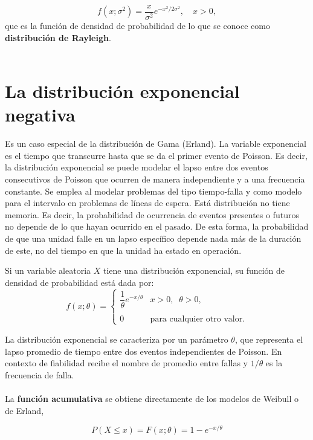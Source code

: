 $$f\left(x;\sigma^2\right)=\dfrac{x}{\sigma^2}e^{-x^2/2\sigma^2},\quad x>0,$$
que es la función de densidad de probabilidad de lo que se conoce como \textbf{distribución de Rayleigh}.\\\\

\section{La distribución exponencial negativa}
Es un caso especial de la distribución de Gama (Erland). La variable exponencial es el tiempo que transcurre hasta que se da el primer evento de Poisson. Es decir, la distribución exponencial se puede modelar el lapso entre dos eventos consecutivos de Poisson que ocurren de manera independiente y a una frecuencia constante. Se emplea al modelar problemas del tipo tiempo-falla y como modelo para el intervalo en problemas de líneas de espera. Está distribución no tiene memoria. Es decir, la probabilidad de ocurrencia de eventos presentes o futuros no depende de lo que hayan ocurrido en el pasado. De esta forma, la probabilidad de que una unidad falle en un lapso específico depende nada más de la duración de este, no del tiempo en que la unidad ha estado en operación.

\begin{tcolorbox}
    \begin{def.}
	Si un variable aleatoria $X$ tiene una distribución exponencial, su función de densidad de probabilidad está dada por:
	$$f(x;\theta)=\left\{
	    \begin{array}{ll}
		\dfrac{1}{\theta}e^{-x/\theta} & x>0,\;\; \theta > 0,\\\\
		0 & \mbox{para cualquier otro valor}.
	    \end{array}
	\right.$$
    \end{def.}
\end{tcolorbox}

La distribución exponencial se caracteriza por un parámetro $\theta$, que representa el lapso promedio de tiempo entre dos eventos independientes de Poisson. En contexto de fiabilidad recibe el nombre de promedio entre fallas y $1/\theta$ es la frecuencia de falla.\\\\
La \textbf{función acumulativa} se obtiene directamente de los modelos de Weibull o de Erland,

\begin{tcolorbox}
    $$P(X\leq x)=F(x;\theta)=1-e^{-x/\theta}$$
\end{tcolorbox}

